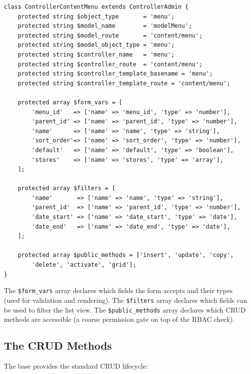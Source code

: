 \documentclass[11pt,a4paper]{article}
\begin{document}
\begin{lstlisting}[caption={AdminController declarative properties (from \texttt{content/menu.php}).},label={lst:admin-declarative}]
class ControllerContentMenu extends ControllerAdmin {
    protected string $object_type       = 'menu';
    protected string $model_name        = 'modelMenu';
    protected string $model_route       = 'content/menu';
    protected string $model_object_type = 'menu';
    protected string $controller_name   = 'menu';
    protected string $controller_route  = 'content/menu';
    protected string $controller_template_basename = 'menu';
    protected string $controller_template_route = 'content/menu';

    protected array $form_vars = [
        'menu_id'   => ['name' => 'menu_id', 'type' => 'number'],
        'parent_id' => ['name' => 'parent_id', 'type' => 'number'],
        'name'      => ['name' => 'name', 'type' => 'string'],
        'sort_order'=> ['name' => 'sort_order', 'type' => 'number'],
        'default'   => ['name' => 'default', 'type' => 'boolean'],
        'stores'    => ['name' => 'stores', 'type' => 'array'],
    ];

    protected array $filters = [
        'name'       => ['name' => 'name', 'type' => 'string'],
        'parent_id'  => ['name' => 'parent_id', 'type' => 'number'],
        'date_start' => ['name' => 'date_start', 'type' => 'date'],
        'date_end'   => ['name' => 'date_end', 'type' => 'date'],
    ];

    protected array $public_methods = ['insert', 'update', 'copy',
        'delete', 'activate', 'grid'];
}
\end{lstlisting}

The \texttt{\$form\_vars} array declares which fields the form accepts
and their types (used for validation and rendering). The
\texttt{\$filters} array declares which fields can be used to filter
the list view. The \texttt{\$public\_methods} array declares which
CRUD methods are accessible (a coarse permission gate on top of the
RBAC check).

\subsection{The CRUD Methods}

The base provides the standard CRUD lifecycle:
\end{document}
